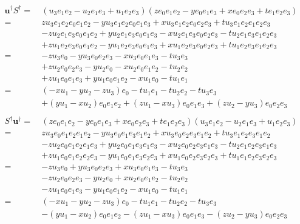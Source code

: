 \documentclass[a4paper,12pt,notitlepage]{jsreport}
\begin{document}
\begin{equation}
  \begin{split}
    \bm{u}^\dag S^\dag = ~ & (u_3 e_1e_2 - u_2 e_1e_3 + u_1 e_2e_3)(z e_0e_1e_2 - y e_0e_1e_3 + x e_0e_2e_3 + t e_1e_2e_3) \\
    = ~ & z u_3 e_1e_2 e_0e_1e_2 - y u_3 e_1e_2 e_0e_1e_3 + x u_3 e_1e_2 e_0e_2e_3 + t u_3 e_1e_2 e_1e_2e_3 \\
    & - z u_2 e_1e_3 e_0e_1e_2 + y u_2 e_1e_3 e_0e_1e_3 - x u_2 e_1e_3 e_0e_2e_3 - t u_2 e_1e_3 e_1e_2e_3 \\
    & + z u_1 e_2e_3 e_0e_1e_2 - y u_1 e_2e_3 e_0e_1e_3 + x u_1 e_2e_3 e_0e_2e_3 + t u_1 e_2e_3 e_1e_2e_3 \\
    = ~ & - z u_3 e_0 - y u_3 e_0e_2e_3 - x u_3 e_0e_1e_3 - t u_3 e_3 \\
    & + z u_2 e_0e_2e_3 - y u_2 e_0 - x u_2 e_0e_1e_2 - t u_2 e_2 \\
    & + z u_1 e_0e_1e_3 + y u_1 e_0e_1e_2 - x u_1 e_0 - t u_1 e_1 \\
    = ~ & (- x u_1 - y u_2 - z u_3) e_0 - t u_1 e_1 - t u_2 e_2 - t u_3 e_3 \\
    & + (y u_1 - x u_2) e_0e_1e_2 + (z u_1 - x u_3) e_0e_1e_3 + (z u_2 - y u_3) e_0e_2e_3\\
  \end{split}
\end{equation}
\begin{equation}
  \begin{split}
    S^\dag \bm{u}^\dag = ~ & (z e_0e_1e_2 - y e_0e_1e_3 + x e_0e_2e_3 + t e_1e_2e_3)(u_3 e_1e_2 - u_2 e_1e_3 + u_1 e_2e_3) \\
    = ~ & z u_3 e_0e_1e_2 e_1e_2 - y u_3 e_0e_1e_3 e_1e_2 + x u_3 e_0e_2e_3 e_1e_2 + t u_3 e_1e_2e_3 e_1e_2 \\
    & - z u_2 e_0e_1e_2 e_1e_3 + y u_2 e_0e_1e_3 e_1e_3 - x u_2 e_0e_2e_3 e_1e_3 - t u_2 e_1e_2e_3 e_1e_3 \\
    & + z u_1 e_0e_1e_2 e_2e_3 - y u_1 e_0e_1e_3 e_2e_3 + x u_1 e_0e_2e_3 e_2e_3 + t u_1 e_1e_2e_3 e_2e_3 \\
    = ~ & - z u_3 e_0 + y u_3 e_0e_2e_3 + x u_3 e_0e_1e_3 - t u_3 e_3 \\
    & - z u_2 e_0e_2e_3 - y u_2 e_0 + x u_2 e_0e_1e_2 - t u_2 e_2 \\
    & - z u_1 e_0e_1e_3 - y u_1 e_0e_1e_2 - x u_1 e_0 - t u_1 e_1 \\
    = ~ & (- x u_1 - y u_2 - z u_3) e_0 - t u_1 e_1 - t u_2 e_2 - t u_3 e_3 \\
    & - (y u_1 - x u_2) e_0e_1e_2 - (z u_1 - x u_3) e_0e_1e_3 - (z u_2 - y u_3) e_0e_2e_3\\
  \end{split}
\end{equation}
\end{document}
